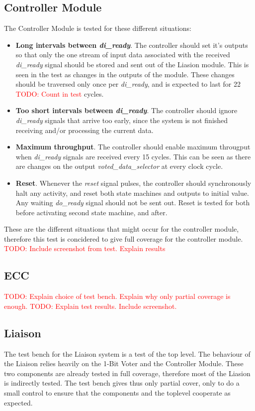 \documentclass[a4paper]{IEEEtran}
\newcommand\TODO[1]{\textcolor{red}{TODO:#1}}
\newcommand\todo[1]{\TODO{#1}}
\begin{document}
\subsection{ Controller Module}
The Controller Module is tested for these different situations:
\begin{itemize}
    \item \textbf{Long intervals between \textit{di\_ready}}. 
        The controller should set it's outputs so that only the one stream of input data associated with the received \textit{di\_ready} signal should be stored and sent out of the Liasion module.
        This is seen in the test as changes in the outputs of the module.
        These changes should be traversed only once per \textit{di\_ready}, and is expected to last for 22 \todo{ Count in test} cycles.
    \item \textbf{Too short intervals between \textit{di\_ready}}.
        The controller should ignore \textit{di\_ready} signals that arrive too early, since the system is not finished receiving and/or processing the current data.
    \item \textbf{Maximum throughput}.
        The controller should enable maximum througput when \textit{di\_ready} signals are received every 15 cycles.
        This can be seen as there are changes on the output \textit{voted\_data\_selector} at every clock cycle.
    \item \textbf{Reset}.
        Whenever the \textit{reset} signal pulses, the controller should synchronously halt any activity, and reset both state machines and outputs to initial value.
        Any waiting \textit{do\_ready} signal should not be sent out.
        Reset is tested for both before activating second state machine, and after. 
\end{itemize}
These are the different situations that might occur for the controller module, therefore this test is concidered to give full coverage for the controller module.
\todo{ Include screenshot from test. Explain results}

\subsection{ ECC }
\todo{ Explain choice of test bench. Explain why only partial coverage is enough. }
\break
\break
\todo{ Explain test results. Include screenshot. }

\subsection{ Liaison }
The test bench for the Liaison system is a test of the top level.
The behaviour of the Liaison relies heavily on the 1-Bit Voter and the Controller Module.
These two components are already tested in full coverage, therefore most of the Liasion is indirectly tested.
The test bench gives thus only partial cover, only to do a small control to ensure that the components and the toplevel cooperate as expected.
\end{document}
